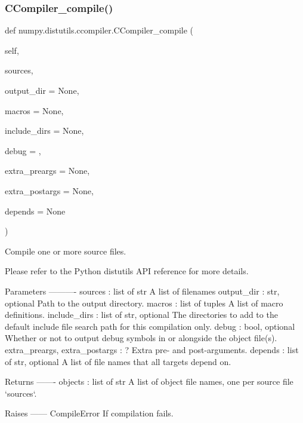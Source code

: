 \subsubsection{\texorpdfstring{C\+Compiler\+\_\+compile()}{CCompiler\_compile()}}
{\footnotesize\ttfamily def numpy.\+distutils.\+ccompiler.\+C\+Compiler\+\_\+compile (\begin{DoxyParamCaption}\item[{}]{self,  }\item[{}]{sources,  }\item[{}]{output\+\_\+dir = {\ttfamily None},  }\item[{}]{macros = {\ttfamily None},  }\item[{}]{include\+\_\+dirs = {\ttfamily None},  }\item[{}]{debug = {},  }\item[{}]{extra\+\_\+preargs = {\ttfamily None},  }\item[{}]{extra\+\_\+postargs = {\ttfamily None},  }\item[{}]{depends = {\ttfamily None} }\end{DoxyParamCaption})}

\begin{DoxyVerb}Compile one or more source files.

Please refer to the Python distutils API reference for more details.

Parameters
----------
sources : list of str
    A list of filenames
output_dir : str, optional
    Path to the output directory.
macros : list of tuples
    A list of macro definitions.
include_dirs : list of str, optional
    The directories to add to the default include file search path for
    this compilation only.
debug : bool, optional
    Whether or not to output debug symbols in or alongside the object
    file(s).
extra_preargs, extra_postargs : ?
    Extra pre- and post-arguments.
depends : list of str, optional
    A list of file names that all targets depend on.

Returns
-------
objects : list of str
    A list of object file names, one per source file `sources`.

Raises
------
CompileError
    If compilation fails.\end{DoxyVerb}
 \mbox{\label{namespacenumpy_1_1distutils_1_1ccompiler_ad092561ded869aafe3f61d069bf092c2}} 
